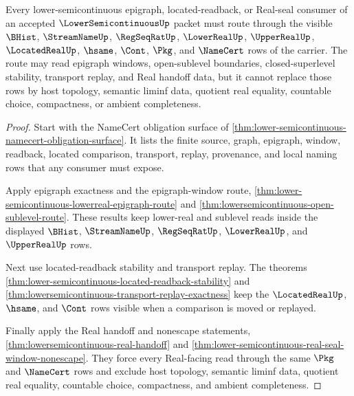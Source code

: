\begin{theorem}
\label{thm:lowersemicontinuous-kernel-scope}
Every lower-semicontinuous epigraph, located-readback, or Real-seal consumer of an accepted $\LowerSemicontinuousUp$ packet must route through the visible $\BHist$, $\StreamNameUp$, $\RegSeqRatUp$, $\LowerRealUp$, $\UpperRealUp$, $\LocatedRealUp$, $\hsame$, $\Cont$, $\Pkg$, and $\NameCert$ rows of the carrier. The route may read epigraph windows, open-sublevel boundaries, closed-superlevel stability, transport replay, and Real handoff data, but it cannot replace those rows by host topology, semantic liminf data, quotient real equality, countable choice, compactness, or ambient completeness.
\end{theorem}
\begin{proof}
Start with the NameCert obligation surface of \autoref{thm:lower-semicontinuous-namecert-obligation-surface}. It lists the finite source, graph, epigraph, window, readback, located comparison, transport, replay, provenance, and local naming rows that any consumer must expose.

Apply epigraph exactness and the epigraph-window route, \autoref{thm:lower-semicontinuous-lowerreal-epigraph-route} and \autoref{thm:lowersemicontinuous-open-sublevel-route}. These results keep lower-real and sublevel reads inside the displayed $\BHist$, $\StreamNameUp$, $\RegSeqRatUp$, $\LowerRealUp$, and $\UpperRealUp$ rows.

Next use located-readback stability and transport replay. The theorems \autoref{thm:lower-semicontinuous-located-readback-stability} and \autoref{thm:lowersemicontinuous-transport-replay-exactness} keep the $\LocatedRealUp$, $\hsame$, and $\Cont$ rows visible when a comparison is moved or replayed.

Finally apply the Real handoff and nonescape statements, \autoref{thm:lowersemicontinuous-real-handoff} and \autoref{thm:lower-semicontinuous-real-seal-window-nonescape}. They force every Real-facing read through the same $\Pkg$ and $\NameCert$ rows and exclude host topology, semantic liminf data, quotient real equality, countable choice, compactness, and ambient completeness.
\end{proof}

